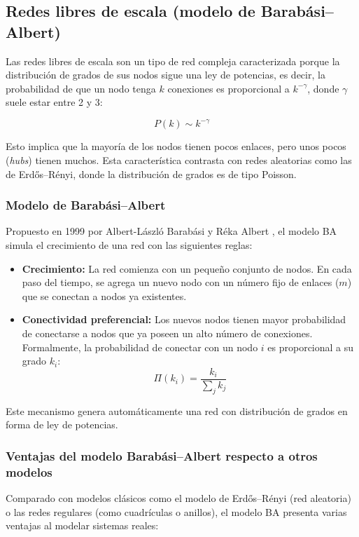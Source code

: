 \subsection{Redes libres de escala (modelo de Barabási–Albert)}

Las redes libres de escala son un tipo de red compleja caracterizada porque la distribución de grados de sus nodos sigue una ley de potencias, es decir, la probabilidad de que un nodo tenga \( k \) conexiones es proporcional a \( k^{-\gamma} \), donde \( \gamma \) suele estar entre 2 y 3:

\[
P(k) \sim k^{-\gamma}
\]

Esto implica que la mayoría de los nodos tienen pocos enlaces, pero unos pocos (\emph{hubs}) tienen muchos. Esta característica contrasta con redes aleatorias como las de Erdős–Rényi, donde la distribución de grados es de tipo Poisson.

\subsubsection*{Modelo de Barabási–Albert}

Propuesto en 1999 por Albert-László Barabási y Réka Albert \cite{barabasi1999emergence}, el modelo BA simula el crecimiento de una red con las siguientes reglas:

\begin{itemize}
    \item \textbf{Crecimiento:} La red comienza con un pequeño conjunto de nodos. En cada paso del tiempo, se agrega un nuevo nodo con un número fijo de enlaces (\( m \)) que se conectan a nodos ya existentes.
    \item \textbf{Conectividad preferencial:} Los nuevos nodos tienen mayor probabilidad de conectarse a nodos que ya poseen un alto número de conexiones. Formalmente, la probabilidad de conectar con un nodo \( i \) es proporcional a su grado \( k_i \): 
    \[
    \Pi(k_i) = \frac{k_i}{\sum_j k_j}
    \]
\end{itemize}

Este mecanismo genera automáticamente una red con distribución de grados en forma de ley de potencias.

\subsubsection*{Ventajas del modelo Barabási–Albert respecto a otros modelos}

Comparado con modelos clásicos como el modelo de Erdős–Rényi (red aleatoria) o las redes regulares (como cuadrículas o anillos), el modelo BA presenta varias ventajas al modelar sistemas reales:

